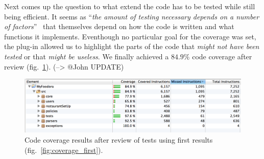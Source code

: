 Next comes up the question to what extend the code has to be tested
while still being efficient.
It seems as ``\textit{the amount of testing necessary depends on a number of
factors}''~\cite{artimaHowMuchCoverage} that themselves depend
on how the code is written and what functions it implements.
Eventhough no particular goal for the coverage was set,
the plug-in allowed us to highlight the parts of the code that \emph{might not have been tested}
or that \emph{might be useless}. We finally achieved a $84.9\%$ code coverage after review (fig.~\ref{fig:coverage_end}). (--> @John UPDATE)

\begin{figure}[h]
  \begin{center}
    \includegraphics[scale=0.47]{./img/coverage_end.png} 
  \end{center}
  \caption{Code coverage results after review of
  tests using first results (fig.~\ref{fig:coverage_first}).}
  \label{fig:coverage_end}
\end{figure}

